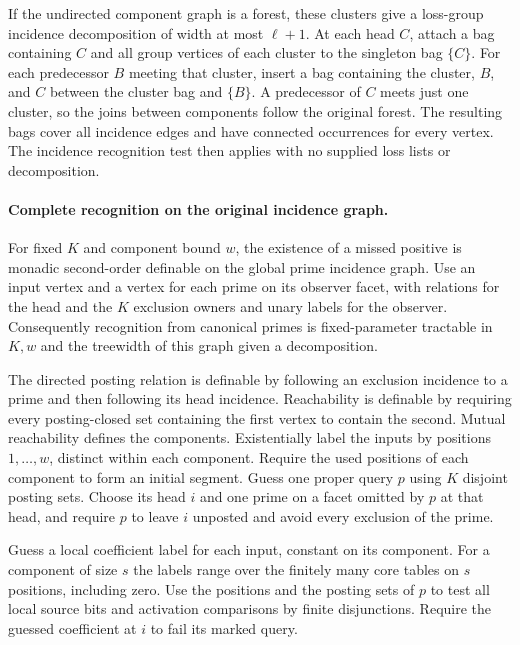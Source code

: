 If the undirected component graph is a forest,
these clusters give a loss-group incidence
decomposition of width at most $\ell+1$. At each
head $C$, attach a bag containing $C$ and all
group vertices of each cluster to the singleton
bag $\{C\}$. For each predecessor $B$ meeting
that cluster, insert a bag containing the cluster,
$B$, and $C$ between the cluster bag and $\{B\}$.
A predecessor of $C$
meets just one cluster, so the joins between
components follow the original forest. The
resulting bags cover all incidence edges and
have connected occurrences for every vertex.
The incidence recognition test then applies
with no supplied loss lists or decomposition.

\paragraph{Complete recognition on the original incidence graph.}
For fixed $K$ and component bound $w$, the existence of a
missed positive is monadic second-order definable on the
global prime incidence graph. Use an input vertex and a
vertex for each prime on its observer facet, with relations
for the head and the $K$ exclusion owners and unary labels
for the observer. Consequently recognition from canonical
primes is fixed-parameter tractable in $K,w$ and the
treewidth of this graph given a decomposition.

The directed posting relation is definable by following an
exclusion incidence to a prime and then following its head
incidence. Reachability is definable by requiring every
posting-closed set containing the first vertex to contain
the second. Mutual reachability defines the components.
Existentially label the inputs by positions $1,\ldots,w$,
distinct within each component. Require the used positions
of each component to form an initial segment. Guess one
proper query $p$ using $K$ disjoint posting sets. Choose its
head $i$ and one prime on a facet omitted by $p$ at that
head, and require $p$ to leave $i$ unposted and avoid every
exclusion of the prime.

Guess a local coefficient label for each input, constant
on its component. For a component of size $s$ the labels
range over the finitely many core tables on $s$ positions,
including zero. Use the positions and the posting sets of
$p$ to test all local source bits and activation comparisons
by finite disjunctions. Require the guessed coefficient
at $i$ to fail its marked query.


